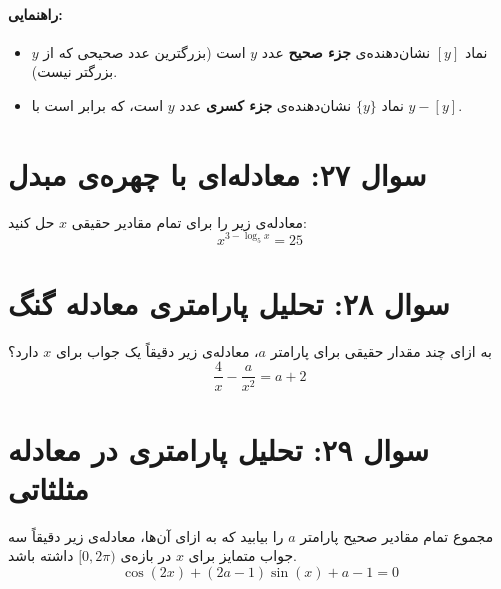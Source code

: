 \documentclass[12pt]{article}
\begin{document}
	\paragraph{راهنمایی:}
	\begin{itemize}[rightmargin=2cm]
		\item نماد \( [y] \) نشان‌دهنده‌ی \textbf{جزء صحیح} عدد \(y\) است (بزرگترین عدد صحیحی که از \(y\) بزرگتر نیست).
		\item نماد \( \{y\} \) نشان‌دهنده‌ی \textbf{جزء کسری} عدد \(y\) است، که برابر است با \(y - [y]\).
	\end{itemize}
	
	\vspace{1cm}
	\hrulefill
	\vspace{1cm}
	
	\section*{سوال ۲۷: معادله‌ای با چهره‌ی مبدل}
	معادله‌ی زیر را برای تمام مقادیر حقیقی \(x\) حل کنید:
	\begin{displaymath}
		x^{3 - \log_{5}x} = 25
	\end{displaymath}
	
	\vspace{1cm}
	\hrulefill
	\vspace{1cm}
	
	\section*{سوال ۲۸: تحلیل پارامتری معادله گنگ}
	به ازای چند مقدار حقیقی برای پارامتر \(a\)، معادله‌ی زیر دقیقاً یک جواب برای \(x\) دارد؟
	\begin{displaymath}
		\frac{4}{x} - \frac{a}{x^2} = a + 2
	\end{displaymath}
	
	\vspace{1cm}
	\hrulefill
	\vspace{1cm}
	
	\section*{سوال ۲۹: تحلیل پارامتری در معادله مثلثاتی}
	مجموع تمام مقادیر صحیح پارامتر \(a\) را بیابید که به ازای آن‌ها، معادله‌ی زیر دقیقاً سه جواب متمایز برای \(x\) در بازه‌ی \( [0, 2\pi) \) داشته باشد.
	\begin{displaymath}
		\cos(2x) + (2a-1)\sin(x) + a - 1 = 0
	\end{displaymath}
	
\end{document}
